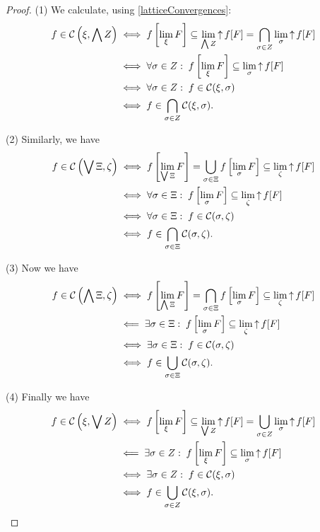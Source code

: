 \begin{proof}
(1) We calculate, using \ref{latticeConvergences}:
\begin{align*}
f \in \operatorname{\mathcal{C}}\left(\xi, \bigwedge Z\right) &\iff f\left[\lim_\xi F \right] \subseteq \lim_{\bigwedge Z} \operatorname{\uparrow} f[F] = \bigcap_{\sigma\in Z}\lim_\sigma \operatorname{\uparrow} f[F] \\
&\iff \forall \sigma\in Z: \; f\left[\lim_\xi F \right] \subseteq \lim_\sigma \operatorname{\uparrow} f[F] \\
&\iff \forall \sigma\in Z: \; f \in \operatorname{\mathcal{C}}(\xi,\sigma) \\
&\iff f\in \bigcap_{\sigma\in Z}\operatorname{\mathcal{C}}(\xi,\sigma).
\end{align*}

(2) Similarly, we have
\begin{align*}
f \in \operatorname{\mathcal{C}}\left(\bigvee \Xi, \zeta\right) &\iff f\left[\lim_{\bigvee \Xi} F \right] = \bigcup_{\sigma\in\Xi}f\left[\lim_\sigma F \right] \subseteq \lim_{\zeta} \operatorname{\uparrow} f[F] \\
&\iff \forall \sigma\in \Xi: \; f\left[\lim_\sigma F \right] \subseteq \lim_\zeta \operatorname{\uparrow} f[F] \\
&\iff \forall \sigma\in \Xi: \; f \in \operatorname{\mathcal{C}}(\sigma, \zeta) \\
&\iff f\in \bigcap_{\sigma\in \Xi}\operatorname{\mathcal{C}}(\sigma, \zeta).
\end{align*}

(3) Now we have
\begin{align*}
f \in \operatorname{\mathcal{C}}\left(\bigwedge \Xi, \zeta\right) &\iff f\left[\lim_{\bigwedge \Xi} F \right] = \bigcap_{\sigma\in\Xi}f\left[\lim_\sigma F \right] \subseteq \lim_{\zeta} \operatorname{\uparrow} f[F] \\
&\impliedby \exists \sigma\in \Xi: \; f\left[\lim_\sigma F \right] \subseteq \lim_\zeta \operatorname{\uparrow} f[F] \\
&\iff \exists \sigma\in \Xi: \; f \in \operatorname{\mathcal{C}}(\sigma, \zeta) \\
&\iff f\in \bigcup_{\sigma\in \Xi}\operatorname{\mathcal{C}}(\sigma, \zeta).
\end{align*}

(4) Finally we have
\begin{align*}
f \in \operatorname{\mathcal{C}}\left(\xi, \bigvee Z\right) &\iff f\left[\lim_\xi F \right] \subseteq \lim_{\bigvee Z} \operatorname{\uparrow} f[F] = \bigcup_{\sigma\in Z}\lim_\sigma \operatorname{\uparrow} f[F] \\
&\impliedby \exists \sigma\in Z: \; f\left[\lim_\xi F \right] \subseteq \lim_\sigma \operatorname{\uparrow} f[F] \\
&\iff \exists \sigma\in Z: \; f \in \operatorname{\mathcal{C}}(\xi,\sigma) \\
&\iff f\in \bigcup_{\sigma\in Z}\operatorname{\mathcal{C}}(\xi,\sigma).
\end{align*}
\end{proof}

